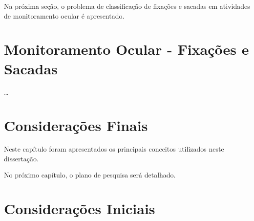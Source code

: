 \documentclass[msc, classic, a4paper]{ufbathesis}
\begin{document}
Na próxima seção, o problema de classificação de fixações e sacadas em atividades de monitoramento ocular é apresentado.

\section{Monitoramento Ocular - Fixações e Sacadas}

\ldots

\section{Considerações Finais}

Neste capítulo foram apresentados os principais conceitos utilizados neste dissertação.

No próximo capítulo, o plano de pesquisa será detalhado.





 \label{trabalhos_relacionados}

\section{Considerações Iniciais}
\end{document}
